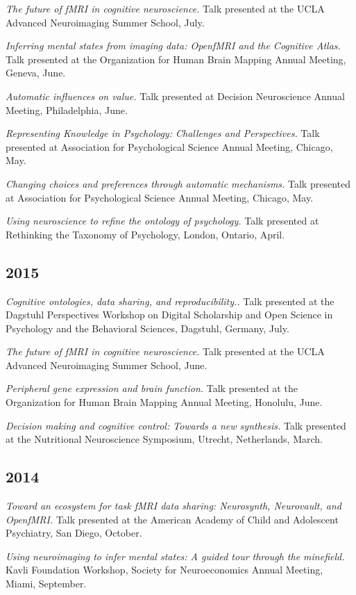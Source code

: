 \documentclass[10pt, letterpaper]{article}
\begin{document}
\textit{The future of fMRI in cognitive neuroscience.} Talk presented at the UCLA Advanced Neuroimaging Summer School, July.

\textit{Inferring mental states from imaging data: OpenfMRI and the Cognitive Atlas.} Talk presented at the Organization for Human Brain Mapping Annual Meeting, Geneva, June.

\textit{Automatic influences on value.} Talk presented at Decision Neuroscience Annual Meeting, Philadelphia, June.

\textit{Representing Knowledge in Psychology: Challenges and Perspectives.} Talk presented at Association for Psychological Science Annual Meeting, Chicago, May.

\textit{Changing choices and preferences through automatic mechanisms.} Talk presented at Association for Psychological Science Annual Meeting, Chicago, May.

\textit{Using neuroscience to refine the ontology of psychology.} Talk presented at Rethinking the Taxonomy of Psychology, London, Ontario, April.

\subsection*{2015}\textit{Cognitive ontologies, data sharing, and reproducibility..} Talk presented at the Dagstuhl Perspectives Workshop on Digital Scholarship and Open Science in Psychology and the Behavioral Sciences, Dagstuhl, Germany, July.

\textit{The future of fMRI in cognitive neuroscience.} Talk presented at the UCLA Advanced Neuroimaging Summer School, June.

\textit{Peripheral gene expression and brain function.} Talk presented at the Organization for Human Brain Mapping Annual Meeting, Honolulu, June.

\textit{Decision making and cognitive control: Towards a new synthesis.} Talk presented at the Nutritional Neuroscience Symposium, Utrecht, Netherlands, March.

\subsection*{2014}\textit{Toward an ecosystem for task fMRI data sharing: Neurosynth, Neurovault, and OpenfMRI.} Talk presented at the American Academy of Child and Adolescent Psychiatry, San Diego, October.

\textit{Using neuroimaging to infer mental states: A guided tour through the minefield.} Kavli Foundation Workshop, Society for Neuroeconomics Annual Meeting, Miami, September.
\end{document}
